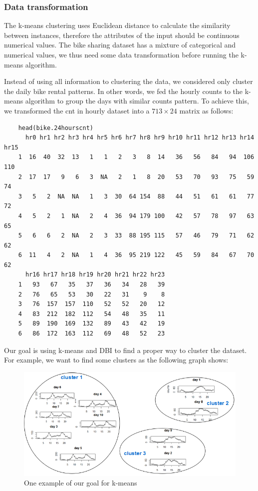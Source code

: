 \documentclass[12pt]{article}
\begin{document}
	\subsubsection{Data transformation}
	The k-means clustering uses Euclidean distance to calculate the similarity between instances, therefore the attributes of the input should be continuous numerical values. The bike sharing dataset has a mixture of categorical and numerical values, we thus need some data transformation before running the k-means algorithm.
	
	Instead of using all information to clustering the data, we considered only cluster the daily bike rental patterns. In other words, we fed the hourly counts to the k-means algorithm to group the days with similar counts pattern. To achieve this, we transformed the cnt in hourly dataset into a $713 \times 24$ matrix as follows: \color{blue}
	\begin{verbatim} 
	head(bike.24hourscnt)
 	  hr0 hr1 hr2 hr3 hr4 hr5 hr6 hr7 hr8 hr9 hr10 hr11 hr12 hr13 hr14 hr15
	1  16  40  32  13   1   1   2   3   8  14   36   56   84   94  106  110
	2  17  17   9   6   3  NA   2   1   8  20   53   70   93   75   59   74
	3   5   2  NA  NA   1   3  30  64 154  88   44   51   61   61   77   72
	4   5   2   1  NA   2   4  36  94 179 100   42   57   78   97   63   65
	5   6   6   2  NA   2   3  33  88 195 115   57   46   79   71   62   62
	6  11   4   2  NA   1   4  36  95 219 122   45   59   84   67   70   62
	  hr16 hr17 hr18 hr19 hr20 hr21 hr22 hr23
	1   93   67   35   37   36   34   28   39
	2   76   65   53   30   22   31    9    8
	3   76  157  157  110   52   52   20   12
	4   83  212  182  112   54   48   35   11
	5   89  190  169  132   89   43   42   19
	6   86  172  163  112   69   48   52   23
	\end{verbatim} \color{black}
	Our goal is using k-means and DBI to find a proper way to cluster the dataset. For example, we want to find some clusters as the following graph shows:
	\begin{figure}[H]
		\centering
		\includegraphics[scale=.8]{figures/cluster_goal.png}
		\caption{One example of our goal for k-means}
	\end{figure}
	
\end{document}
